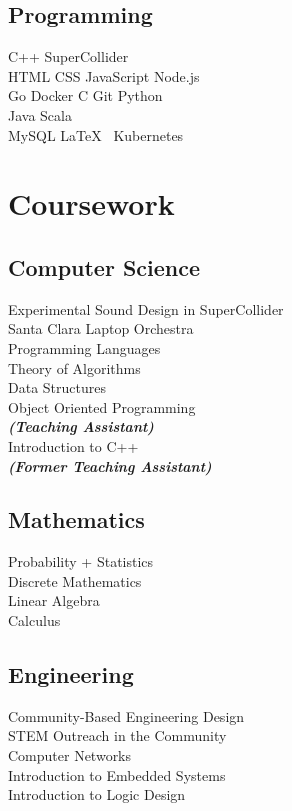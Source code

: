 \documentclass[]{deedy-resume-openfont}
\begin{document}
\begin{minipage}[t]{0.33\textwidth}
\subsection{Programming}
C++ \textbullet{}  SuperCollider \\
HTML \textbullet{}  CSS  \textbullet{} JavaScript \textbullet{} 
Node.js \\
\textbullet{} Go \textbullet{} Docker \textbullet{}
C \textbullet{} Git \textbullet{} Python \\
\textbullet{} Java \textbullet{} Scala \\
\textbullet{} MySQL \textbullet{} \LaTeX\ \textbullet{} Kubernetes 
\sectionsep


\section{Coursework}
\subsection{Computer Science}
Experimental Sound Design in SuperCollider \\
Santa Clara Laptop Orchestra \\
Programming Languages \\
Theory of Algorithms \\
Data Structures \\
Object Oriented Programming \\
{\footnotesize \textit{\textbf{(Teaching Assistant)}}}\\
Introduction to C++ \\
{\footnotesize \textit{\textbf{(Former Teaching Assistant)}}}
\sectionsep

\subsection{Mathematics}
Probability + Statistics \\
Discrete Mathematics \\
Linear Algebra \\
Calculus \\
\sectionsep

\subsection{Engineering}
Community-Based Engineering Design\\
STEM Outreach in the Community \\
Computer Networks \\
Introduction to Embedded Systems \\
Introduction to Logic Design 
\sectionsep


\end{minipage}
\end{document}
